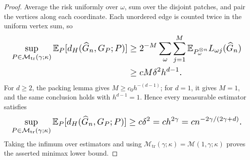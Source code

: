 \documentclass{article}
\begin{document}
\begin{proof}
Average the risk uniformly over \(\omega\), sum over the disjoint patches, and pair the vertices along each coordinate. Each unordered edge is counted twice in the uniform vertex sum, so
\[
\makebox[\linewidth][c]{\resizebox{0.98\linewidth}{!}{\(\displaystyle \begin{aligned}
\sup_{P\in\mathcal M_{\mathrm{tr}}(\gamma;\kappa)}
\mathbb E_P[d_H(\widehat G_n,G_P;P)]
&\ge2^{-M}\sum_\omega\sum_{j=1}^M
\mathbb E_{P_\omega^{\otimes n}}L_{\omega j}(\widehat G_n)\\
&\ge cM\delta^2h^{d-1}.
\end{aligned}\)}}
\]
For \(d\ge2\), the packing lemma gives \(M\ge c_0h^{-(d-1)}\); for \(d=1\), it gives \(M=1\), and the same conclusion holds with \(h^{d-1}=1\). Hence every measurable estimator satisfies
\[
\makebox[\linewidth][c]{\resizebox{0.98\linewidth}{!}{\(\displaystyle \sup_{P\in\mathcal M_{\mathrm{tr}}(\gamma;\kappa)}
\mathbb E_P[d_H(\widehat G_n,G_P;P)]
\ge c\delta^2=ch^{2\gamma}
=cn^{-2\gamma/(2\gamma+d)}.\)}}
\]
Taking the infimum over estimators and using \(\mathcal M_{\mathrm{tr}}(\gamma;\kappa)=\mathcal M(1,\gamma;\kappa)\) proves the asserted minimax lower bound.
\end{proof}
\end{document}
